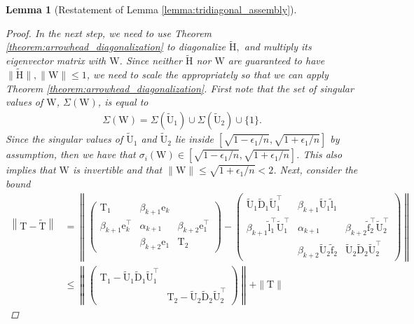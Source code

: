 \documentclass{article}
\newcommand{\lnorm}{\left\|}
\newcommand{\rnorm}{\right\|}
\newtheorem{lemma}{Lemma}[section]
\newcommand\vece{\boldsymbol{\mathrm{e}}}
\newcommand\vecftilde{\widetilde{\boldsymbol{\mathrm{f}}}}
\newcommand\vecltilde{\widetilde{\boldsymbol{\mathrm{l}}}}
\newcommand\matT{\boldsymbol{\mathrm{T}}}
\newcommand\matW{\boldsymbol{\mathrm{W}}}
\newcommand\matDtilde{\widetilde{\boldsymbol{\mathrm{D}}}}
\newcommand\matHtilde{\widetilde{\boldsymbol{\mathrm{H}}}}
\newcommand\matTtilde{\widetilde{\boldsymbol{\mathrm{T}}}}
\newcommand\matUtilde{\widetilde{\boldsymbol{\mathrm{U}}}}
\begin{document}
\begin{lemma}[Restatement of Lemma \ref{lemma:tridiagonal_assembly}]
\begin{proof}
        In the next step, we need to use Theorem \ref{theorem:arrowhead_diagonalization} to diagonalize $\matHtilde,$ and multiply its eigenvector matrix with $\matW$. 
        Since neither $\matHtilde$ nor $\matW$ are guaranteed to have $\|\matHtilde\|,\|\matW\|\leq 1$, we need to scale the appropriately so that we can apply Theorem \ref{theorem:arrowhead_diagonalization}.
        First note that the set of singular values of $\matW$, $\Sigma(\matW)$, is equal to
        \begin{align*}
            \Sigma(\matW) = \Sigma(\matUtilde_1) \cup \Sigma(\matUtilde_2) \cup \{1\}.
        \end{align*}
        Since the singular values of $\matUtilde_1$ and $\matUtilde_2$ lie inside $[\sqrt{1-\epsilon_1/n},\sqrt{1+\epsilon_1/n}]$ by assumption, then we have that $\sigma_i(\matW)\in[\sqrt{1-\epsilon_1/n},\sqrt{1+\epsilon_1/n}]$. This also implies that $\matW$ is invertible and that $\|\matW\|\leq \sqrt{1+\epsilon_1/n} <2 $. Next, consider the bound
        \begin{align*}
        \lnorm\matT-\matTtilde\rnorm
        &=
            \lnorm
            \begin{pmatrix}
                \matT_1 & \beta_{k+1}\vece_k & \\
                \beta_{k+1}\vece_k^\top & \alpha_{k+1} & \beta_{k+2}\vece_1^\top \\
                 & \beta_{k+2}\vece_1 & \matT_2
            \end{pmatrix}
            -
            \begin{pmatrix}
                \matUtilde_1\matDtilde_1\matUtilde_1^\top & \beta_{k+1}\matUtilde_1\vecltilde_1 & \\
                \beta_{k+1}\vecltilde_1^\top\matUtilde_1^\top & \alpha_{k+1} & \beta_{k+2}\vecftilde_2^\top\matUtilde_2^\top \\
                 & \beta_{k+2}\matUtilde_2\vecftilde_2 & \matUtilde_2\matDtilde_2\matUtilde_2^\top
            \end{pmatrix}
            \rnorm
            \\
            &\leq
            \lnorm
            \begin{pmatrix}
                \matT_1-\matUtilde_1\matDtilde_1\matUtilde_1^\top &  \\\
                 &  \matT_2 - \matUtilde_2\matDtilde_2\matUtilde_2^\top
            \end{pmatrix}
            \rnorm
            +
            \|\matT\|

\end{align*}
\end{proof}
\end{lemma}
\end{document}
